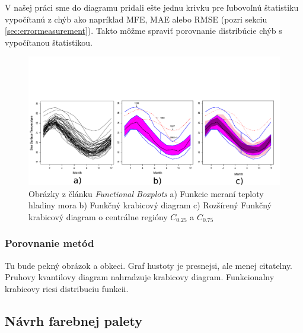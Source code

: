 V našej práci sme do diagramu pridali ešte jednu krivku pre ľubovoľnú štatistiku vypočítanú z chýb ako napríklad MFE, MAE alebo RMSE (pozri sekciu \ref{sec:errormeasurement}). Takto môžme spraviť porovnanie distribúcie chýb s vypočítanou štatistikou.


\begin{figure}
	\centering
	\hspace*{-0.9in}
	\includegraphics[width = 7.5in]{functionalboxplot}
	\caption{Obrázky z článku \textit{Functional Boxplots}  \cite{FunctionalBoxplot}  a) Funkcie meraní teploty hladiny mora b) Funkčný krabicový diagram c) Rozšírený Funkčný krabicový diagram o centrálne regióny $ C_{0.25} $ a $ C_{0.75} $ }
	\label{fig:functionalboxplot}
\end{figure}



\subsubsection{Porovnanie metód}

Tu bude pekný obrázok a obkeci.
Graf hustoty je presnejsi, ale menej citatelny.
Pruhovy kvantilovy diagram nahradzuje krabicovy diagram.
Funkcionalny krabicovy riesi distribuciu funkcii.

\subsection{Návrh farebnej palety}
